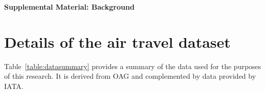 \onecolumn
\pagebreak
\begin{center}
\textbf{\large Supplemental Material: Background}
\end{center}
\setcounter{equation}{0}
\setcounter{figure}{0}
\setcounter{table}{0}
\setcounter{section}{0}
\setcounter{page}{1}
\makeatletter
\renewcommand{\theequation}{S.\arabic{equation}}
\renewcommand{\thefigure}{S.\Roman{figure}}
\renewcommand{\thetable}{S.\Roman{table}}
\renewcommand{\thesection}{S.\Roman{section}}

\section{Details of the air travel dataset} \label{sec:data}

Table~\ref{table:datasummary} provides a summary of the data used for the purposes of this research. It is derived from \ac{OAG} and complemented by data provided by \ac{IATA}.

